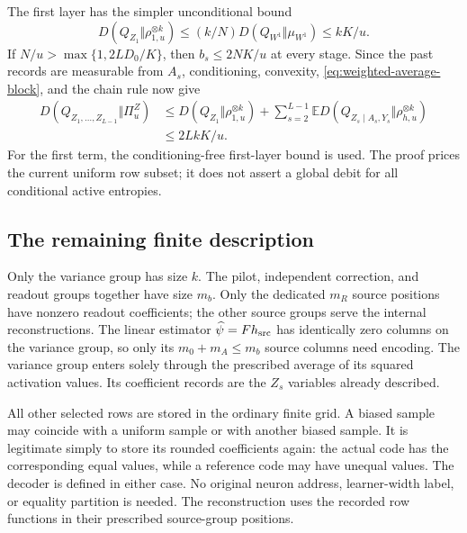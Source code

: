 The first layer has the simpler unconditional bound
\[
 D(Q_{Z_1}\Vert\rho_{1,u}^{\otimes k})
 \le(k/N)D(Q_{W^1}\Vert\mu_{W^1})\le kK/u.
\]
If $N/u>\max\{1,2LD_0/K\}$, then $b_s\le2NK/u$ at every stage.
Since the past records are measurable from $A_s$, conditioning, convexity,
\eqref{eq:weighted-average-block}, and the chain rule now give
\begin{equation}\label{eq:weighted-z-kl}
 \begin{split}
 D(Q_{Z_1,\ldots,Z_{L-1}}\Vert\Pi_u^Z)
 &\le D(Q_{Z_1}\Vert\rho_{1,u}^{\otimes k})
       +\sum_{s=2}^{L-1}\mathbb E
       D(Q_{Z_s\mid A_s,Y_s}\Vert\rho_{h,u}^{\otimes k})\\
 &\le 2LkK/u.
 \end{split}
\end{equation}
For the first term, the conditioning-free first-layer bound is used.
The proof prices the current uniform row subset; it does not assert a
global debit for all conditional active entropies.

\subsection{The remaining finite description}

Only the variance group has size $k$. The pilot, independent correction,
and readout groups together have size $m_b$. Only the dedicated $m_R$ source
positions have nonzero readout coefficients; the other source groups
serve the internal reconstructions. The linear estimator
$\widehat\psi=Fh_{\rm src}$ has identically zero columns on the variance
group, so only its $m_0+m_A\le m_b$ source columns need encoding.
The variance group enters solely through the prescribed average of
its squared activation values. Its coefficient records are the $Z_s$
variables already described.

All other selected rows are stored in the ordinary finite grid. A biased
sample may coincide with a uniform sample or with another biased sample.
It is legitimate simply to store its rounded coefficients again: the
actual code has the corresponding equal values, while a reference code
may have unequal values. The decoder is defined in either case. No
original neuron address, learner-width label, or equality partition is
needed. The reconstruction uses the recorded row functions in their
prescribed source-group positions.

